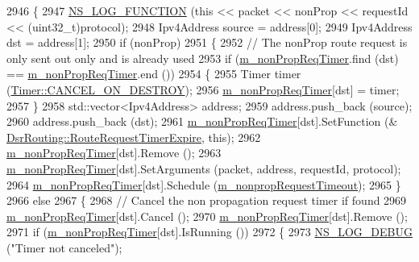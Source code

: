 \begin{DoxyCode}
2946 \{
2947   \hyperlink{log-macros-disabled_8h_a90b90d5bad1f39cb1b64923ea94c0761}{NS\_LOG\_FUNCTION} (\textcolor{keyword}{this} << packet << nonProp << requestId << (uint32\_t)protocol);
2948   Ipv4Address source = address[0];
2949   Ipv4Address dst = address[1];
2950   \textcolor{keywordflow}{if} (nonProp)
2951     \{
2952       \textcolor{comment}{// The nonProp route request is only sent out only and is already used}
2953       \textcolor{keywordflow}{if} (\hyperlink{classns3_1_1dsr_1_1DsrRouting_a0936df610f90f7e79c24a2a8cdea6c14}{m\_nonPropReqTimer}.find (dst) == \hyperlink{classns3_1_1dsr_1_1DsrRouting_a0936df610f90f7e79c24a2a8cdea6c14}{m\_nonPropReqTimer}.end ())
2954         \{
2955           Timer timer (\hyperlink{classns3_1_1Timer_a816309b83cd2a35bea47d9bbc6bbf721a07a9dd5063b32fb6cf1f813c6ee7e28e}{Timer::CANCEL\_ON\_DESTROY});
2956           \hyperlink{classns3_1_1dsr_1_1DsrRouting_a0936df610f90f7e79c24a2a8cdea6c14}{m\_nonPropReqTimer}[dst] = timer;
2957         \}
2958       std::vector<Ipv4Address> address;
2959       address.push\_back (source);
2960       address.push\_back (dst);
2961       \hyperlink{classns3_1_1dsr_1_1DsrRouting_a0936df610f90f7e79c24a2a8cdea6c14}{m\_nonPropReqTimer}[dst].SetFunction (&
      \hyperlink{classns3_1_1dsr_1_1DsrRouting_aa839b89cdf568048c4d09941b59e46d4}{DsrRouting::RouteRequestTimerExpire}, \textcolor{keyword}{this});
2962       \hyperlink{classns3_1_1dsr_1_1DsrRouting_a0936df610f90f7e79c24a2a8cdea6c14}{m\_nonPropReqTimer}[dst].Remove ();
2963       \hyperlink{classns3_1_1dsr_1_1DsrRouting_a0936df610f90f7e79c24a2a8cdea6c14}{m\_nonPropReqTimer}[dst].SetArguments (packet, address, requestId, protocol);
2964       \hyperlink{classns3_1_1dsr_1_1DsrRouting_a0936df610f90f7e79c24a2a8cdea6c14}{m\_nonPropReqTimer}[dst].Schedule (\hyperlink{classns3_1_1dsr_1_1DsrRouting_a42c2f43fbb0c5fefed36689eaf5c720e}{m\_nonpropRequestTimeout});
2965     \}
2966   \textcolor{keywordflow}{else}
2967     \{
2968       \textcolor{comment}{// Cancel the non propagation request timer if found}
2969       \hyperlink{classns3_1_1dsr_1_1DsrRouting_a0936df610f90f7e79c24a2a8cdea6c14}{m\_nonPropReqTimer}[dst].Cancel ();
2970       \hyperlink{classns3_1_1dsr_1_1DsrRouting_a0936df610f90f7e79c24a2a8cdea6c14}{m\_nonPropReqTimer}[dst].Remove ();
2971       \textcolor{keywordflow}{if} (\hyperlink{classns3_1_1dsr_1_1DsrRouting_a0936df610f90f7e79c24a2a8cdea6c14}{m\_nonPropReqTimer}[dst].IsRunning ())
2972         \{
2973           \hyperlink{group__logging_ga413f1886406d49f59a6a0a89b77b4d0a}{NS\_LOG\_DEBUG} (\textcolor{stringliteral}{"Timer not canceled"});

\end{DoxyCode}
